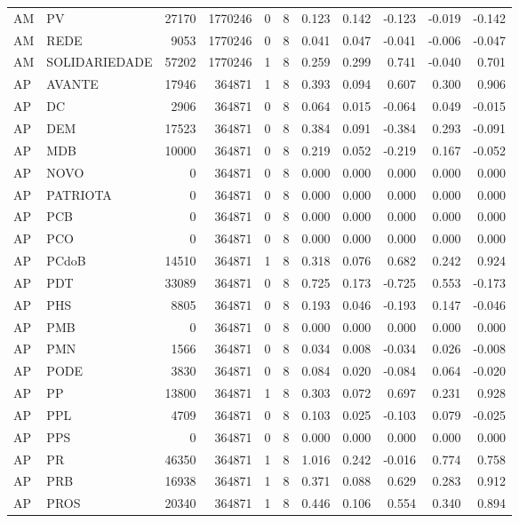 \begin{landscape}
\begin{longtable}{llrrrrrrrrr}
AM & PV & 27170 & 1770246 & 0 & 8 & 0.123 & 0.142 & -0.123 & -0.019 & -0.142 \\
AM & REDE & 9053 & 1770246 & 0 & 8 & 0.041 & 0.047 & -0.041 & -0.006 & -0.047 \\
AM & SOLIDARIEDADE & 57202 & 1770246 & 1 & 8 & 0.259 & 0.299 & 0.741 & -0.040 & 0.701 \\
AP & AVANTE & 17946 & 364871 & 1 & 8 & 0.393 & 0.094 & 0.607 & 0.300 & 0.906 \\
AP & DC & 2906 & 364871 & 0 & 8 & 0.064 & 0.015 & -0.064 & 0.049 & -0.015 \\
AP & DEM & 17523 & 364871 & 0 & 8 & 0.384 & 0.091 & -0.384 & 0.293 & -0.091 \\
AP & MDB & 10000 & 364871 & 0 & 8 & 0.219 & 0.052 & -0.219 & 0.167 & -0.052 \\
AP & NOVO & 0 & 364871 & 0 & 8 & 0.000 & 0.000 & 0.000 & 0.000 & 0.000 \\
AP & PATRIOTA & 0 & 364871 & 0 & 8 & 0.000 & 0.000 & 0.000 & 0.000 & 0.000 \\
AP & PCB & 0 & 364871 & 0 & 8 & 0.000 & 0.000 & 0.000 & 0.000 & 0.000 \\
AP & PCO & 0 & 364871 & 0 & 8 & 0.000 & 0.000 & 0.000 & 0.000 & 0.000 \\
AP & PCdoB & 14510 & 364871 & 1 & 8 & 0.318 & 0.076 & 0.682 & 0.242 & 0.924 \\
AP & PDT & 33089 & 364871 & 0 & 8 & 0.725 & 0.173 & -0.725 & 0.553 & -0.173 \\
AP & PHS & 8805 & 364871 & 0 & 8 & 0.193 & 0.046 & -0.193 & 0.147 & -0.046 \\
AP & PMB & 0 & 364871 & 0 & 8 & 0.000 & 0.000 & 0.000 & 0.000 & 0.000 \\
AP & PMN & 1566 & 364871 & 0 & 8 & 0.034 & 0.008 & -0.034 & 0.026 & -0.008 \\
AP & PODE & 3830 & 364871 & 0 & 8 & 0.084 & 0.020 & -0.084 & 0.064 & -0.020 \\
AP & PP & 13800 & 364871 & 1 & 8 & 0.303 & 0.072 & 0.697 & 0.231 & 0.928 \\
AP & PPL & 4709 & 364871 & 0 & 8 & 0.103 & 0.025 & -0.103 & 0.079 & -0.025 \\
AP & PPS & 0 & 364871 & 0 & 8 & 0.000 & 0.000 & 0.000 & 0.000 & 0.000 \\
AP & PR & 46350 & 364871 & 1 & 8 & 1.016 & 0.242 & -0.016 & 0.774 & 0.758 \\
AP & PRB & 16938 & 364871 & 1 & 8 & 0.371 & 0.088 & 0.629 & 0.283 & 0.912 \\
AP & PROS & 20340 & 364871 & 1 & 8 & 0.446 & 0.106 & 0.554 & 0.340 & 0.894 \\

\end{longtable}
\end{landscape}
